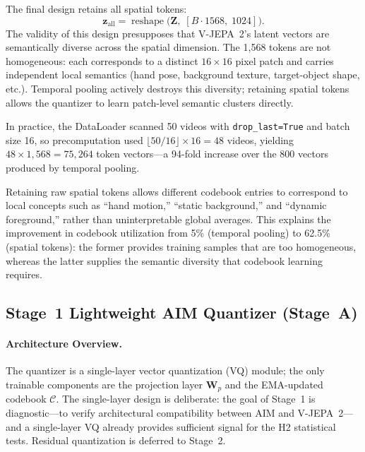 \documentclass{article}
\begin{document}
The final design retains all spatial tokens:
%
\begin{equation}
  \mathbf{z}_{\text{all}}
  = \operatorname{reshape}\!\bigl(\mathbf{Z},\;
    [B \cdot 1568,\; 1024]\bigr).
\end{equation}
%
The validity of this design presupposes that V-JEPA~2's latent vectors are
semantically diverse across the spatial dimension.  The 1,568 tokens are not
homogeneous: each corresponds to a distinct $16\times16$ pixel patch and carries
independent local semantics (hand pose, background texture, target-object shape,
etc.).  Temporal pooling actively destroys this diversity; retaining spatial
tokens allows the quantizer to learn patch-level semantic clusters directly.

In practice, the DataLoader scanned 50 videos with \texttt{drop\_last=True} and
batch size 16, so precomputation used
$\lfloor 50/16\rfloor \times 16 = 48$ videos, yielding
$48 \times 1{,}568 = 75{,}264$ token vectors---a 94-fold increase over the
800 vectors produced by temporal pooling.

Retaining raw spatial tokens allows different codebook entries to correspond to
local concepts such as ``hand motion,'' ``static background,'' and ``dynamic
foreground,'' rather than uninterpretable global averages.  This explains the
improvement in codebook utilization from 5\% (temporal pooling) to 62.5\%
(spatial tokens): the former provides training samples that are too homogeneous,
whereas the latter supplies the semantic diversity that codebook learning
requires.

\subsection{Stage~1 Lightweight AIM Quantizer (Stage~A)}\label{sec:quantizer}

\paragraph{Architecture Overview.}
The quantizer is a single-layer vector quantization (VQ) module; the only
trainable components are the projection layer $\mathbf{W}_p$ and the
EMA-updated codebook $\mathcal{C}$.  The single-layer design is deliberate:
the goal of Stage~1 is diagnostic---to verify architectural compatibility
between AIM and V-JEPA~2---and a single-layer VQ already provides sufficient
signal for the H2 statistical tests.  Residual quantization is deferred to
Stage~2.
\end{document}
